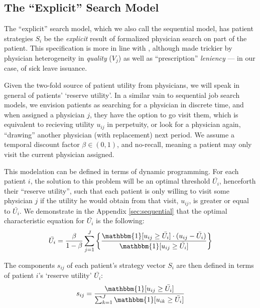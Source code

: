 \documentclass[../main.tex]{subfiles}
\begin{document}
\subsection{The ``Explicit'' Search Model}

The ``explicit'' search model, which we also call the sequential model, has patient strategies $S_i$ be the \textit{explicit} result of formalized physician search on part of the patient. This specification is more in line with \cite{schnell2017physician}, although made trickier by physician heterogeneity in \textit{quality} ($V_j$) as well as ``prescription'' \textit{leniency} — in our case, of sick leave issuance.

Given the two-fold source of patient utility from physicians, we will speak in general of patients' `reserve utility'. In a similar vain to sequential job search models, we envision patients as searching for a physician in discrete time, and when assigned a physician $j$, they have the option to go visit them, which is equivalent to recieving utility $u_{ij}$ in perpetuity, or look for a physician again, ``drawing'' another physician (with replacement) next period. We assume a temporal discount factor $\beta \in (0,1)$, and no-recall, meaning a patient may only visit the current physician assigned.

This modelation can be defined in terms of dynamic programming. For each patient $i$, the solution to this problem will be an optimal threshold $\bar{U_i}$, henceforth their ``reserve utility'', such that each patient is only willing to visit some physician $j$ if the utility he would obtain from that visit, $u_{ij}$, is greater or equal to $\bar{U_i}$. We demonstrate in the Appendix \ref{sec:sequential} that the optimal characteristic equation for $\bar{U_i}$ is the following:
\begin{equation}
    \bar{U_i} = \frac{\beta}{1-\beta}  \sum_{j=1}^{J} \left\{ \frac{\mathbbm{1}[ u_{ij} \geq \bar{U_i} ] \cdot (u_{ij} - \bar{U_i})}{\mathbbm{1}[ u_{ij} \geq \bar{U_i} ]} \right\}
    \label{eq:seq4}  
\end{equation}

The components $s_{ij}$ of each patient's strategy vector $S_i$ are then defined in terms of patient $i$'s `reserve utility' $\bar{U_i}$:
\begin{equation}
    s_{ij} = \frac{\mathbbm{1}[ u_{ij} \geq \bar{U_i} ]}
    {\sum_{k=1}^{J} \mathbbm{1}[ u_{ik} \geq \bar{U_i} ]}
    \label{eq:Schnell_s}  
\end{equation}
\end{document}
